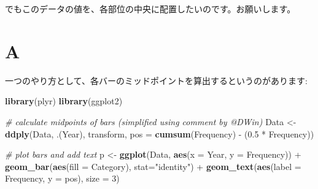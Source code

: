 \documentclass[]{book}
\newenvironment{Shaded}{\begin{snugshade}}{\end{snugshade}}
\newcommand{\KeywordTok}[1]{\textcolor[rgb]{0.13,0.29,0.53}{\textbf{{#1}}}}
\newcommand{\DataTypeTok}[1]{\textcolor[rgb]{0.13,0.29,0.53}{{#1}}}
\newcommand{\DecValTok}[1]{\textcolor[rgb]{0.00,0.00,0.81}{{#1}}}
\newcommand{\FloatTok}[1]{\textcolor[rgb]{0.00,0.00,0.81}{{#1}}}
\newcommand{\StringTok}[1]{\textcolor[rgb]{0.31,0.60,0.02}{{#1}}}
\newcommand{\CommentTok}[1]{\textcolor[rgb]{0.56,0.35,0.01}{\textit{{#1}}}}
\newcommand{\NormalTok}[1]{{#1}}
\begin{document}
でもこのデータの値を、各部位の中央に配置したいのです。お願いします。

\section{A}\label{a-1}

一つのやり方として、各バーのミッドポイントを算出するというのがあります:

\begin{Shaded}
\begin{Highlighting}[]
\KeywordTok{library}\NormalTok{(plyr)}
\KeywordTok{library}\NormalTok{(ggplot2)}

\CommentTok{# calculate midpoints of bars (simplified using comment by @DWin)}
\NormalTok{Data <-}\StringTok{ }\KeywordTok{ddply}\NormalTok{(Data, .(Year), transform, }\DataTypeTok{pos =} \KeywordTok{cumsum}\NormalTok{(Frequency) -}\StringTok{ }\NormalTok{(}\FloatTok{0.5} \NormalTok{*}\StringTok{ }\NormalTok{Frequency))}

\CommentTok{# plot bars and add text}
\NormalTok{p <-}\StringTok{ }\KeywordTok{ggplot}\NormalTok{(Data, }\KeywordTok{aes}\NormalTok{(}\DataTypeTok{x =} \NormalTok{Year, }\DataTypeTok{y =} \NormalTok{Frequency)) +}
\StringTok{     }\KeywordTok{geom_bar}\NormalTok{(}\KeywordTok{aes}\NormalTok{(}\DataTypeTok{fill =} \NormalTok{Category), }\DataTypeTok{stat=}\StringTok{"identity"}\NormalTok{) +}
\StringTok{     }\KeywordTok{geom_text}\NormalTok{(}\KeywordTok{aes}\NormalTok{(}\DataTypeTok{label =} \NormalTok{Frequency, }\DataTypeTok{y =} \NormalTok{pos), }\DataTypeTok{size =} \DecValTok{3}\NormalTok{)}
\end{Highlighting}
\end{Shaded}
\end{document}
